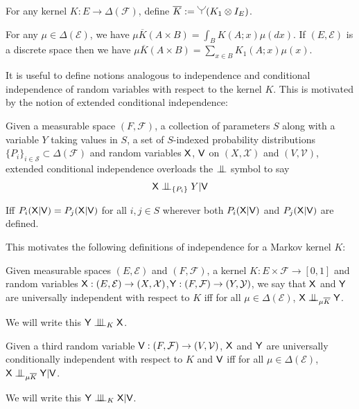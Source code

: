 For any kernel $K:E\to\Delta(\mathcal{F})$, define $\overline{K}:=\splitter{0.15}(K_1\otimes I_E)$.

For any $\mu\in \Delta(\mathcal{E})$, we have $\mu \overline{K}(A\times B)=\int_B K(A;x) \mu(dx)$. If $(E,\mathcal{E})$ is a discrete space then we have $\mu \overline{K}(A\times B)=\sum_{x\in B} K_1(A;x) \mu(x)$\cite{fong_causal_2013}.

It is useful to define notions analogous to independence and conditional independence of random variables with respect to the kernel $K$. This is motivated by the notion of extended conditional independence:

\begin{definition}\label{def:eci}
Given a measurable space $(F,\mathcal{F})$, a collection of parameters $S$ along with a variable $Y$ taking values in $S$, a set of $S$-indexed probability distributions $\{P_i\}_{i\in \mathcal{S}}\subset\Delta(\mathcal{F})$ and random variables $\mathsf{X}$, $\mathsf{V}$ on $(X,\mathcal{X})$ and $(V,\mathcal{V})$, extended conditional independence overloads the $\CI$ symbol to say
\begin{align}
    \RV{X}\CI_{\{P_i\}} Y | \RV{V}
\end{align}

Iff $P_i(\mathsf{X}|\mathsf{V})=P_j(\mathsf{X}|\mathsf{V})$ for all $i,j\in S$ wherever both $P_i(\mathsf{X}|\mathsf{V})$ and $P_j(\mathsf{X}|\mathsf{V})$ are defined.
\end{definition}

This motivates the following definitions of independence for a Markov kernel $K$:

\begin{definition}\label{def:univ_indep}
Given measurable spaces $(E,\mathcal{E})$ and $(F,\mathcal{F})$, a kernel $K:E\times\mathcal{F}\to[0,1]$ and random variables $\mathsf{X}:(E,\mathcal{E})\to (X,\mathcal{X})$,$\mathsf{Y}:(F,\mathcal{F})\to (Y,\mathcal{Y})$, we say that $\mathsf{X}$ and $\mathsf{Y}$ are universally independent with respect to $K$ iff for all $\mu\in \Delta(\mathcal{E})$, $\RV{X}\CI_{\mu \overline{K}} \RV{Y}$. 

We will write this $\RV{Y} \CII_K \RV{X}$.

Given a third random variable $\mathsf{V}:( F,\mathcal{F})\to(V,\mathcal{V})$, $\mathsf{X}$ and $\mathsf{Y}$ are universally conditionally independent with respect to $K$ and $\mathsf{V}$ iff for all $\mu\in \Delta(\mathcal{E})$, $\RV{X}\CI_{\mu \overline{K}} \RV{Y}|\RV{V}$.

We will write this $\RV{Y} \CII_K \RV{X} | \RV{V}$.
\end{definition}

